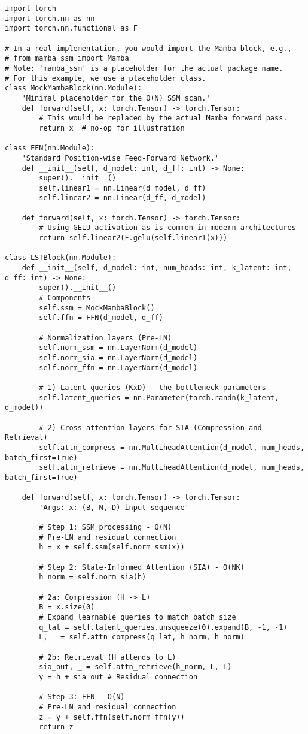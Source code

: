\documentclass[10pt,twocolumn,letterpaper]{article}
\begin{document}
\begin{lstlisting}[style=pytorchstyle, caption={PyTorch-style pseudocode for the LST Block.}, label=lst:code_block]
import torch
import torch.nn as nn
import torch.nn.functional as F

# In a real implementation, you would import the Mamba block, e.g.,
# from mamba_ssm import Mamba
# Note: 'mamba_ssm' is a placeholder for the actual package name.
# For this example, we use a placeholder class.
class MockMambaBlock(nn.Module):
    'Minimal placeholder for the O(N) SSM scan.'
    def forward(self, x: torch.Tensor) -> torch.Tensor:
        # This would be replaced by the actual Mamba forward pass.
        return x  # no-op for illustration

class FFN(nn.Module):
    'Standard Position-wise Feed-Forward Network.'
    def __init__(self, d_model: int, d_ff: int) -> None:
        super().__init__()
        self.linear1 = nn.Linear(d_model, d_ff)
        self.linear2 = nn.Linear(d_ff, d_model)

    def forward(self, x: torch.Tensor) -> torch.Tensor:
        # Using GELU activation as is common in modern architectures
        return self.linear2(F.gelu(self.linear1(x)))

class LSTBlock(nn.Module):
    def __init__(self, d_model: int, num_heads: int, k_latent: int, d_ff: int) -> None:
        super().__init__()
        # Components
        self.ssm = MockMambaBlock()
        self.ffn = FFN(d_model, d_ff)

        # Normalization layers (Pre-LN)
        self.norm_ssm = nn.LayerNorm(d_model)
        self.norm_sia = nn.LayerNorm(d_model)
        self.norm_ffn = nn.LayerNorm(d_model)

        # 1) Latent queries (KxD) - the bottleneck parameters
        self.latent_queries = nn.Parameter(torch.randn(k_latent, d_model))

        # 2) Cross-attention layers for SIA (Compression and Retrieval)
        self.attn_compress = nn.MultiheadAttention(d_model, num_heads, batch_first=True)
        self.attn_retrieve = nn.MultiheadAttention(d_model, num_heads, batch_first=True)

    def forward(self, x: torch.Tensor) -> torch.Tensor:
        'Args: x: (B, N, D) input sequence'

        # Step 1: SSM processing - O(N)
        # Pre-LN and residual connection
        h = x + self.ssm(self.norm_ssm(x))

        # Step 2: State-Informed Attention (SIA) - O(NK)
        h_norm = self.norm_sia(h)

        # 2a: Compression (H -> L)
        B = x.size(0)
        # Expand learnable queries to match batch size
        q_lat = self.latent_queries.unsqueeze(0).expand(B, -1, -1)
        L, _ = self.attn_compress(q_lat, h_norm, h_norm)

        # 2b: Retrieval (H attends to L)
        sia_out, _ = self.attn_retrieve(h_norm, L, L)
        y = h + sia_out # Residual connection

        # Step 3: FFN - O(N)
        # Pre-LN and residual connection
        z = y + self.ffn(self.norm_ffn(y))
        return z
\end{lstlisting}
\end{document}
